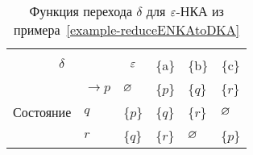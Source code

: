 \begin{table}[H]
\centering
\begin{tabular}{llllll}
\toprule
%
\multicolumn{2}{c}{\multirow{2}{*}{\Large $\delta$}}
	& \multicolumn{4}{c}{\text{Вход}} \\
%
\cmidrule(rl){3-6}
%
\multicolumn{2}{c}{}
	& \multicolumn{1}{c}{$\varepsilon$}
    & \multicolumn{1}{c}{\{a\}}
    & \multicolumn{1}{c}{\{b\}}
    & \multicolumn{1}{c}{\{c\}} \\
%
\midrule
%
\multirow{5}{*}{Состояние}
    & $\to p$ & $\varnothing$  		& \{$p$\} 		& \{$q$\} 	& \{$r$\} 	\\
    & $q$ & \{$p$\} 	& \{$q$\} 		& \{$r$\} 	& $\varnothing$     \\
    & $\boxed{r}$ & \{$q$\} 	& \{$r$\} 		& $\varnothing$		& \{$p$\} 	\\
\bottomrule
\end{tabular}
\caption{Функция перехода $\delta$ для $\varepsilon$-НКА из примера~\ref{example-reduceENKAtoDKA}}
\label{tab5}
\end{table}
